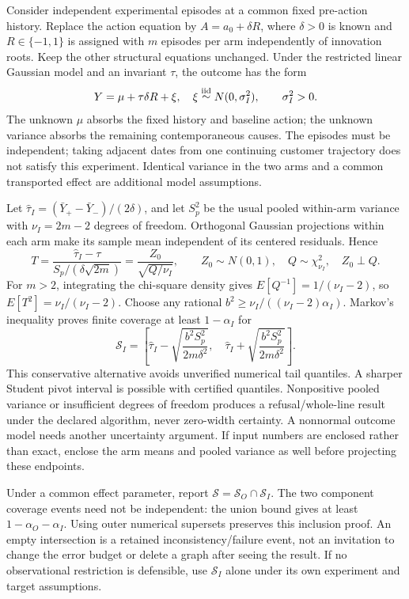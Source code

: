 Consider independent experimental episodes at a common fixed pre-action
history. Replace the action equation by \(A=a_0+\delta R\), where
\(\delta>0\) is known and \(R\in\{-1,1\}\) is assigned with \(m\)
episodes per arm independently of innovation roots. Keep the other
structural equations unchanged. Under the restricted linear Gaussian
model and an invariant \(\tau\), the outcome has the form \[
 Y=\mu+\tau\delta R+\xi,\quad
 \xi\mathrel{\mathop\sim^{\rm iid}}N(0,\sigma_I^2),\qquad \sigma_I^2>0.
\] The unknown \(\mu\) absorbs the fixed history and baseline action;
the unknown variance absorbs the remaining contemporaneous causes. The
episodes must be independent; taking adjacent dates from one continuing
customer trajectory does not satisfy this experiment. Identical variance
in the two arms and a common transported effect are additional model
assumptions.

Let \(\widehat\tau_I=(\bar Y_+-\bar Y_-)/(2\delta)\), and let \(S_p^2\)
be the usual pooled within-arm variance with \(\nu_I=2m-2\) degrees of
freedom. Orthogonal Gaussian projections within each arm make its sample
mean independent of its centered residuals. Hence \[
 T=\frac{\widehat\tau_I-\tau}{S_p/(\delta\sqrt{2m})}
   =\frac{Z_0}{\sqrt{Q/\nu_I}},\qquad
 Z_0\sim N(0,1),\quad Q\sim\chi^2_{\nu_I},\quad Z_0\perp Q.
\] For \(m>2\), integrating the chi-square density gives
\(E[Q^{-1}]=1/(\nu_I-2)\), so \(E[T^2]=\nu_I/(\nu_I-2)\). Choose any
rational \(b^2\ge\nu_I/((\nu_I-2)\alpha_I)\). Markov's inequality proves
finite coverage at least \(1-\alpha_I\) for \[
 \mathcal S_I=\left[\widehat\tau_I-
  \sqrt{\frac{b^2S_p^2}{2m\delta^2}},\quad
  \widehat\tau_I+\sqrt{\frac{b^2S_p^2}{2m\delta^2}}\right].
\] This conservative alternative avoids unverified numerical tail
quantiles. A sharper Student pivot interval is possible with certified
quantiles. Nonpositive pooled variance or insufficient degrees of
freedom produces a refusal/whole-line result under the declared
algorithm, never zero-width certainty. A nonnormal outcome model needs
another uncertainty argument. If input numbers are enclosed rather than
exact, enclose the arm means and pooled variance as well before
projecting these endpoints.

Under a common effect parameter, report
\(\mathcal S=\mathcal S_O\cap\mathcal S_I\). The two component coverage
events need not be independent: the union bound gives at least
\(1-\alpha_O-\alpha_I\). Using outer numerical supersets preserves this
inclusion proof. An empty intersection is a retained
inconsistency/failure event, not an invitation to change the error
budget or delete a graph after seeing the result. If no observational
restriction is defensible, use \(\mathcal S_I\) alone under its own
experiment and target assumptions.

